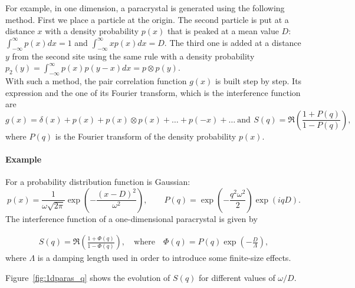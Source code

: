 For example, in one dimension, a paracrystal is generated using the following method. First we place a particle at the origin. The second particle is put at a distance $x$ with a density probability $p(x)$ that is peaked at a mean value $D$: $\int_{-\infty} ^{\infty}p(x)dx=1$ and $\int_{-\infty}^{\infty}xp(x)dx=D$. The third one is added at a distance $y$ from the second site using the same rule with a density probability $p_2(y)= \int_{-\infty}^{\infty}p(x)p(y-x)dx=p\otimes p(y)$.\\ With such a method, the pair correlation function $g(x)$ is built step by step. Its expression and the one of its Fourier transform, which is the interference function are 
\begin{equation*}
g(x)=\delta(x)+ p(x)+ p(x)\otimes p(x)+\ldots + p(-x)+\ldots \: \mathrm{and}\:\, S(q)=\Re\left(\dfrac{1+P(q)}{1-P(q)}\right),
\end{equation*}
 where $P(q)$ is the Fourier transform of the density probability $p(x)$.\\

\paragraph{Example} For a probability distribution function is Gaussian:
\begin{equation*}
p(x)=\frac{1}{\omega \sqrt{2\pi}} \exp\left(-\dfrac{(x-D)^2}{\omega^2}\right),\qquad P(q)=\exp\left(-\frac{q^2 \omega^2}{2}\right)\exp(iqD).
\end{equation*}
 The interference function of a one-dimensional paracrystal is given by

\begin{align*}
S(q) =\Re \left(\frac{1+\Phi(q) }{1 - \Phi(q)} \right), \quad \mathrm{where}\quad \Phi(q) = P(q)\exp\left(-\frac{D}{\Lambda}\right),
\end{align*}
where $\Lambda$ is a damping length used in order to introduce some finite-size effects.

Figure~\ref{fig:1dparas_q} shows the evolution of $S(q)$ for different values of $\omega /D$. 

